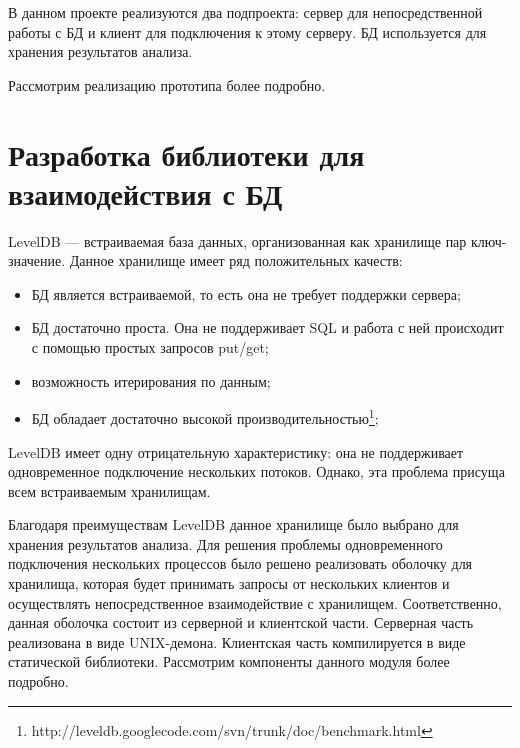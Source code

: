 В данном проекте реализуются два подпроекта: сервер для непосредственной работы с БД и клиент для подключения к этому серверу. БД используется для хранения результатов анализа.

Рассмотрим реализацию прототипа более подробно.

\section{Разработка библиотеки для взаимодействия с БД}
LevelDB --- встраиваемая база данных, организованная как хранилище пар ключ-значение. Данное хранилище имеет ряд положительных качеств:
\begin{itemize}
\item БД является встраиваемой, то есть она не требует поддержки сервера;
\item БД достаточно проста. Она не поддерживает SQL и работа с ней происходит с помощью простых запросов put/get;
\item возможность итерирования по данным;
\item БД обладает достаточно высокой производительностью\footnote{http://leveldb.googlecode.com/svn/trunk/doc/benchmark.html};
\end{itemize}

LevelDB имеет одну отрицательную характеристику: она не поддерживает одновременное подключение нескольких потоков. Однако, эта проблема присуща всем встраиваемым хранилищам.

Благодаря преимуществам LevelDB данное хранилище было выбрано для хранения результатов анализа. Для решения проблемы одновременного подключения нескольких процессов было решено реализовать оболочку для хранилища, которая будет принимать запросы от нескольких клиентов и осуществлять непосредственное взаимодействие с хранилищем. Соответственно, данная оболочка состоит из серверной и клиентской части. Серверная часть реализована в виде UNIX-демона. Клиентская часть компилируется в виде статической библиотеки. Рассмотрим компоненты данного модуля более подробно.

